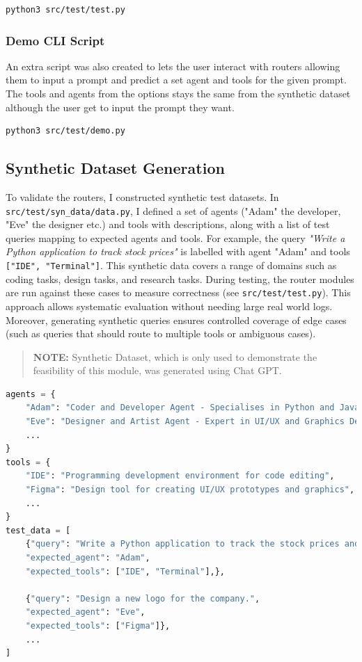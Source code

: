 \begin{verbatim}
python3 src/test/test.py
\end{verbatim}


\subsubsection{Demo CLI Script}
\label{demo cli script}
An extra script was also created to lets the user interact with routers allowing them to input a prompt and predict a set agent and tools for the given prompt. The tools and agents from the options stays the same from the synthetic dataset although the user get to input the prompt they want.

\begin{verbatim}
python3 src/test/demo.py
\end{verbatim}


\subsection{Synthetic Dataset Generation}
\label{synthetic dataset generation}
To validate the routers, I constructed synthetic test datasets. In \texttt{src/test/syn\_data/data.py}, I defined a set of agents ("Adam" the developer, "Eve" the designer etc.) and tools with descriptions, along with a list of test queries mapping to expected agents and tools. For example, the query \textit{"Write a Python application to track stock prices"} is labelled with agent "Adam" and tools \texttt{["IDE", "Terminal"]}. This synthetic data covers a range of domains such as coding tasks, design tasks, and research tasks. During testing, the router modules are run against these cases to measure correctness (see \texttt{src/test/test.py}). This approach allows systematic evaluation without needing large real world logs. Moreover, generating synthetic queries ensures controlled coverage of edge cases (such as queries that should route to multiple tools or ambiguous cases).

\begin{quote}
\textbf{NOTE:} Synthetic Dataset, which is only used to demonstrate the feasibility of this module, was generated using Chat GPT.
\end{quote}

\begin{lstlisting}[language=Python, caption={Example of the synthetic dataset}, breaklines=true]
agents = {
    "Adam": "Coder and Developer Agent - Specialises in Python and JavaScript development; creates scripts and applications.",
    "Eve": "Designer and Artist Agent - Expert in UI/UX and Graphics Design; produces content.",
    ...
}
tools = {
    "IDE": "Programming development environment for code editing",
    "Figma": "Design tool for creating UI/UX prototypes and graphics",
    ...
}
test_data = [
    {"query": "Write a Python application to track the stock prices and generate a report.",
    "expected_agent": "Adam",
    "expected_tools": ["IDE", "Terminal"],},

    {"query": "Design a new logo for the company.",
    "expected_agent": "Eve",
    "expected_tools": ["Figma"]},
    ...
]

\end{lstlisting}

